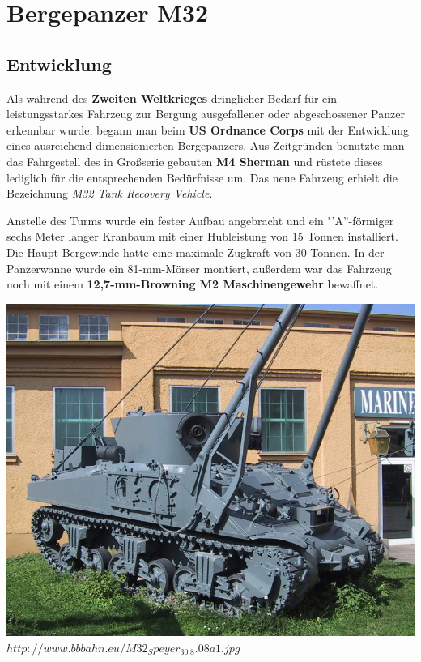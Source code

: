 \documentclass[12pt,a4paper]{report}
\begin{document}
\chapter{Bergepanzer M32}
\section{Entwicklung}
\par 
Als während des {\bf Zweiten Weltkrieges} dringlicher Bedarf für ein leistungsstarkes Fahrzeug zur Bergung ausgefallener oder abgeschossener Panzer erkennbar wurde, begann man beim {\bf US Ordnance Corps} mit der Entwicklung eines ausreichend dimensionierten Bergepanzers. Aus Zeitgründen benutzte man das Fahrgestell des in Großserie gebauten {\bf M4 Sherman} und rüstete dieses lediglich für die entsprechenden Bedürfnisse um. Das neue Fahrzeug erhielt die Bezeichnung {\it M32 Tank Recovery Vehicle}.
\par
Anstelle des Turms wurde ein fester Aufbau angebracht und ein "'A''-förmiger sechs Meter langer Kranbaum mit einer Hubleistung von 15 Tonnen installiert. Die Haupt-Bergewinde hatte eine maximale Zugkraft von 30 Tonnen. In der Panzerwanne wurde ein 81-mm-Mörser montiert, außerdem war das Fahrzeug noch mit einem {\bf 12,7-mm-Browning M2 Maschinengewehr} bewaffnet.


\includegraphics[trim = -19cm 0 0 -9cm,scale=0.2]{M32}
\\
\noindent\hspace*{25mm}$http://www.bbbahn.eu/M32_Speyer_30.8.08a1.jpg$
\end{document}
